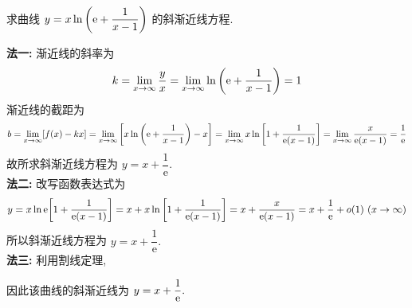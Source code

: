 \begin{example}[2023 数一]
    求曲线 $y=x\ln\qty(\mathrm{e}+\dfrac{1}{x-1})$ 的斜渐近线方程.
\end{example}
\begin{solution}
    \textbf{法一: }渐近线的斜率为 $$k=\lim_{x\to\infty}\dfrac{y}{x}=\lim_{x\to\infty}\ln\qty(\mathrm{e}+\dfrac{1}{x-1})=1$$
    渐近线的截距为 $$b=\lim_{x\to\infty}[f(x)-kx]=\lim_{x\to\infty}\qty[x\ln\qty(\mathrm{e}+\dfrac{1}{x-1})-x]=\lim_{x\to\infty}x\ln\qty[1+\dfrac{1}{\mathrm{e}(x-1)}]=\lim_{x\to\infty}\dfrac{x}{\mathrm{e}(x-1)}=\dfrac{1}{\mathrm{e}}$$
    故所求斜渐近线方程为 $y=x+\dfrac{1}{\mathrm{e}}$.\\
    \textbf{法二: }改写函数表达式为 $$y=x\ln\mathrm{e}\qty[1+\dfrac{1}{\mathrm{e}(x-1)}]=x+x\ln\qty[1+\dfrac{1}{\mathrm{e}(x-1)}]=x+\dfrac{x}{\mathrm{e}(x-1)}=x+\dfrac{1}{\mathrm{e}}+o(1)~  (x\to\infty)$$
    所以斜渐近线方程为 $y=x+\dfrac{1}{\mathrm{e}}.$\\
    \textbf{法三: }利用割线定理, 
    因此该曲线的斜渐近线为 $y=x+\dfrac{1}{\mathrm{e}}.$
\end{solution}
